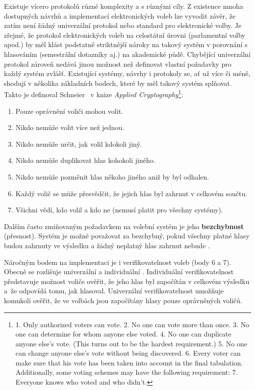 \label{section:pozadavky}
Existuje vícero protokolů různé komplexity a s různými cíly. Z existence mnoha dostupných návrhů a implementací elektronických voleb lze vyvodit závěr, že zatím není žádný univerzální protokol nebo standard pro elektronické volby.  Je zřejmé, že protokol elektronických voleb na celostátní úrovni (parlamentní volby apod.) by měl klást podstatně striktnější nároky na takový systém v porovnání s hlasováním (semestrální dotazníky aj.)  na akademické půdě. Chybějící univerzální protokol zároveň nedává jinou možnost než definovat vlastní požadavky pro každý systém zvlášť.
\clearpage
Existující systémy, návrhy i protokoly se, ať už více či méně, shodují v několika základních bodech, které by měl takový systém splňovat. Takto je definoval Schneier~\cite{Schneier1996} v knize \textit{Applied Cryptography}\footnote{
1. Only authorized voters can vote.
2. No one can vote more than once.
3. No one can determine for whom anyone else voted.
4. No one can duplicate anyone else’s vote. (This turns out to be the
hardest requirement.)
5. No one can change anyone else’s vote without being discovered.
6. Every voter can make sure that his vote has been taken into account
in the final tabulation.
Additionally, some voting schemes may have the following requirement:
7. Everyone knows who voted and who didn’t.\cite{Schneier1996}
}:
\begin{enumerate}
	\item Pouze oprávnění voliči mohou volit.
	\item Nikdo nemůže volit více než jednou.
	\item Nikdo nemůže určit, jak volil kdokoli jiný.
	\item Nikdo nemůže duplikovat hlas kohokoli jiného.
	\item Nikdo nemůže pozměnit hlas někoho jiného aniž by byl odhalen.
	\item Každý volič se může přesvědčit, že jejich hlas byl zahrnut v celkovém součtu.
	\item Všichni vědí, kdo volil a kdo ne (nemusí platit pro všechny systémy).
\end{enumerate}


Dalším často zmiňovaným požadavkem na volební systém je jeho \textbf{bezchybnost} (přesnost). Systém je možné považovat za bezchybný, pokud všechny platné hlasy budou zahrnuty ve výsledku a žádný neplatný hlas zahrnut nebude \cite{4285237}\cite{QADAH2007376}\cite{10.1007/978-3-642-03315-5_13}.

Náročným bodem na implementaci je i verifikovatelnost voleb (body 6 a 7). Obecně se rozlišuje univerzální a individuální \cite{4285237}\cite{10.1007/978-3-642-03315-5_13}. Individuální verifikovatelnost představuje možnost voliče ověřit, že jeho hlas byl započítán v celkovém výsledku a~že odpovídá tomu, jak hlasoval. Univerzální verifikovatelnost umožňuje komukoli ověřit, že ve volbách jsou započítány hlasy pouze oprávněných voličů.

